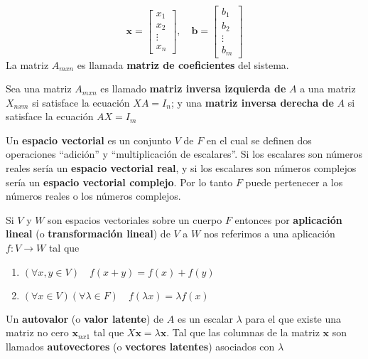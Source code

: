 \begin{defi}
$$\mathbf{x} =
\begin{bmatrix}
x_1 \\
x_2 \\
\vdots \\
x_n
\end{bmatrix}
, \quad
\mathbf{b} =
\begin{bmatrix}
b_1 \\
b_2 \\
\vdots \\
b_m
\end{bmatrix}$$
La matriz $A_{mxn}$ es llamada \textbf{matriz de coeficientes} del sistema.
\end{defi}

\begin{defi}\citep{Blyth_2002}
    Sea una matriz $A_{mxn}$ es llamado \textbf{matriz inversa izquierda de} $A$ a una matriz $X_{nxm}$ si satisface la ecuación $XA=I_n$; y una \textbf{matriz inversa derecha de} $A$ si satisface la ecuación $AX=I_m$
\end{defi}

\begin{defi}\citep{Blyth_2002}
    Un \textbf{espacio vectorial} es un conjunto $V$ de $F$ en el cual se definen dos operaciones ``adición'' y ``multiplicación de escalares''. Si los escalares son números reales sería un \textbf{espacio vectorial real}, y si los escalares son números complejos sería un \textbf{espacio vectorial complejo}. Por lo tanto $F$ puede pertenecer a los números reales o los números complejos.
\end{defi}

\begin{defi}\citep{Blyth_2002}
    Si $V$ y $W$ son espacios vectoriales sobre un cuerpo $F$ entonces por \textbf{aplicación lineal} (o \textbf{transformación lineal}) de $V$ a $W$ nos referimos a una aplicación $f: V \to W $ tal que
    \begin{enumerate}
        \item $(\forall x,y \in V) \quad f(x+y)=f(x)+f(y)$
        \item $(\forall x \in V)(\forall \lambda \in F) \quad f(\lambda x)=\lambda f(x)$ 
    \end{enumerate}
\end{defi}

\begin{defi}\citep{Blyth_2002}
    Un \textbf{autovalor} (o \textbf{valor latente}) de $A$ es un escalar $\lambda$ para el que existe una matriz no cero $\mathbf{x}_{nx1}$ tal que $X\mathbf{x}=\lambda \mathbf{x}$. Tal que las columnas de la matriz $\mathbf{x}$ son llamados \textbf{autovectores} (o \textbf{vectores latentes}) asociados con $\lambda$
\end{defi}

